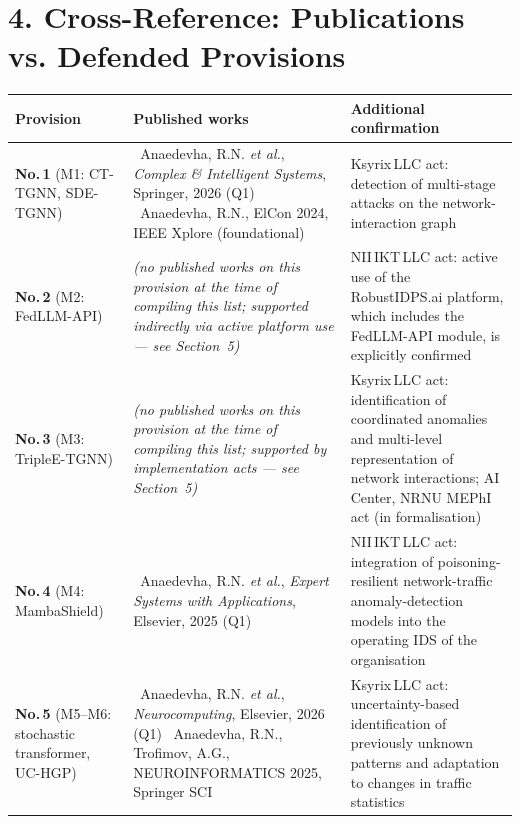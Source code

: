 \documentclass[11pt,a4paper]{article}
\begin{document}
\vspace{-0.2cm}

\section*{4. Cross-Reference: Publications vs. Defended Provisions}

\begin{longtable}{>{\raggedright\arraybackslash}p{} >{\raggedright\arraybackslash}p{} >{\centering\arraybackslash}p{}}
\toprule
\textbf{Provision} & \textbf{Published works} & \textbf{Additional confirmation} \\
\midrule
\endhead

\textbf{No.\,1} (M1: CT-TGNN, SDE-TGNN) &
[3]~Anaedevha, R.N. \textit{et al.}, \textit{Complex \& Intelligent Systems}, Springer, 2026 (Q1) \newline
[7]~Anaedevha, R.N., ElCon 2024, IEEE Xplore (foundational) &
Ksyrix\,LLC act: detection of multi-stage attacks on the network-interaction graph \\
\midrule

\textbf{No.\,2} (M2: FedLLM-API) &
\emph{(no published works on this provision at the time of compiling this list; supported indirectly via active platform use --- see Section~5)} &
NII\,IKT\,LLC act: active use of the RobustIDPS.ai platform, which includes the FedLLM-API module, is explicitly confirmed \\
\midrule

\textbf{No.\,3} (M3: TripleE-TGNN) &
\emph{(no published works on this provision at the time of compiling this list; supported by implementation acts --- see Section~5)} &
Ksyrix\,LLC act: identification of coordinated anomalies and multi-level representation of network interactions; AI Center, NRNU MEPhI act (in formalisation) \\
\midrule

\textbf{No.\,4} (M4: MambaShield) &
[1]~Anaedevha, R.N. \textit{et al.}, \textit{Expert Systems with Applications}, Elsevier, 2025 (Q1) &
NII\,IKT\,LLC act: integration of poisoning-resilient network-traffic anomaly-detection models into the operating IDS of the organisation \\
\midrule

\textbf{No.\,5} (M5--M6: stochastic transformer, UC-HGP) &
[2]~Anaedevha, R.N. \textit{et al.}, \textit{Neurocomputing}, Elsevier, 2026 (Q1) \newline
[5]~Anaedevha, R.N., Trofimov, A.G., NEUROINFORMATICS 2025, Springer SCI &
Ksyrix\,LLC act: uncertainty-based identification of previously unknown patterns and adaptation to changes in traffic statistics \\
\midrule


\end{longtable}
\end{document}
